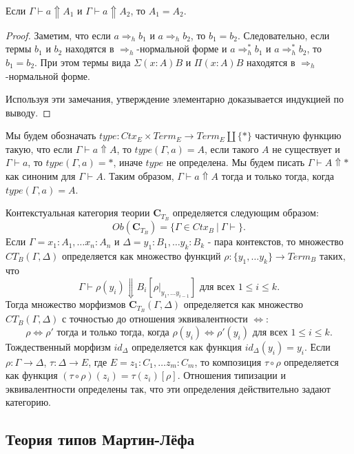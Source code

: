 \documentclass{amsart}
\theoremstyle{definition}
\theoremstyle{remark}
\newcommand{\red}{\Rightarrow}
\newcommand{\deq}{\Leftrightarrow}
\newcommand{\cat}[1]{\mathbf{#1}}
\renewcommand{\C}{\cat{C}}
\numberwithin{figure}{section}
\begin{document}
\begin{prop}
Если $\Gamma \vdash a \Uparrow A_1$ и $\Gamma \vdash a \Uparrow A_2$, то $A_1 = A_2$.
\end{prop}
\begin{proof}
Заметим, что если $a \red_h b_1$ и $a \red_h b_2$, то $b_1 = b_2$.
Следовательно, если термы $b_1$ и $b_2$ находятся в $\red_h$-нормальной форме и $a \red^*_h b_1$ и $a \red^*_h b_2$, то $b_1 = b_2$.
При этом термы вида $\Sigma (x : A) B$ и $\Pi (x : A) B$ находятся в $\red_h$-нормальной форме.

Используя эти замечания, утверждение элементарно доказывается индукцией по выводу.
\end{proof}

Мы будем обозначать $type : Ctx_E \times Term_E \to Term_E \amalg \{ * \}$ частичную функцию такую, что если $\Gamma \vdash a \Uparrow A$, то $type(\Gamma, a) = A$, если такого $A$ не существует и $\Gamma \vdash a$, то $type(\Gamma, a) = *$, иначе $type$ не определена.
Мы будем писать $\Gamma \vdash A \Uparrow *$ как синоним для $\Gamma \vdash A$.
Таким образом, $\Gamma \vdash a \Uparrow A$ тогда и только тогда, когда $type(\Gamma, a) = A$.

Контекстуальная категория теории $\C_{T_B}$ определяется следующим образом:
\[ Ob(\C_{T_B}) = \{ \Gamma \in Ctx_B\ |\ \Gamma \vdash \}. \]
Если $\Gamma = x_1 : A_1, \ldots x_n : A_n$ и $\Delta = y_1 : B_1, \ldots y_k : B_k$ - пара контекстов,
то множество $CT_B(\Gamma, \Delta)$ определяется как множество функций $\rho : \{ y_1, \ldots y_k\} \to Term_B$ таких, что
\[ \Gamma \vdash \rho(y_i) \Downarrow B_i[\rho |_{y_1, \ldots y_{i-1}}] \text{ для всех } 1 \leq i \leq k. \]
Тогда множество морфизмов $\C_{T_B}(\Gamma, \Delta)$ определяется как множество $CT_B(\Gamma, \Delta)$ с точностью до отношения эквивалентности $\deq$:
\[ \rho \deq \rho' \text{ тогда и только тогда, когда } \rho(y_i) \deq \rho'(y_i) \text{ для всех } 1 \leq i \leq k. \]
Тождественный морфизм $id_\Delta$ определяется как функция $id_\Delta(y_i) = y_i$.
Если $\rho : \Gamma \to \Delta$, $\tau : \Delta \to E$, где $E = z_1 : C_1, \ldots z_m : C_m$, то композиция $\tau \circ \rho$ определяется как функция $(\tau \circ \rho)(z_i) = \tau(z_i)[\rho]$.
Отношения типизации и эквивалентности определены так, что эти определения действительно задают категорию.

\subsection{Теория типов Мартин-Лёфа}
\end{document}
